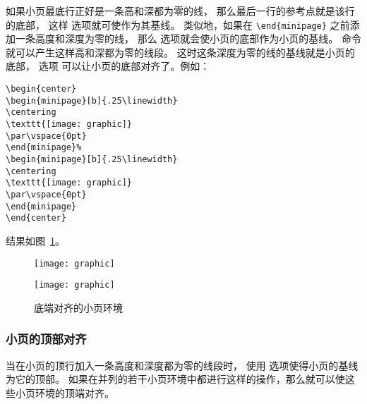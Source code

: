 如果小页最底行正好是一条高和深都为零的线，
那么最后一行的参考点就是该行的底部，
这样 \opt{[b]} 选项就可使作为其基线。
类似地，如果在 \verb|\end{minipage}| 之前添加一条高度和深度为零的线，
那么 \opt{[b]} 选项就会使小页的底部作为小页的基线。
命令  就可以产生这样高和深都为零的线段。
这时这条深度为零的线的基线就是小页的底部，
选项 \opt{[b]} 可以让小页的底部对齐了。例如：
\begin{lstlisting}
\begin{center}
\begin{minipage}[b]{.25\linewidth}
\centering
\texttt{[image: graphic]}
\par\vspace{0pt}
\end{minipage}%
\begin{minipage}[b]{.25\linewidth}
\centering
\texttt{[image: graphic]}
\par\vspace{0pt}
\end{minipage}
\end{center}
\end{lstlisting}
结果如图~\ref{fig:minipagesamp-2}。
\begin{figure}
\begin{center}
	\begin{minipage}[b]{.25\linewidth}
		\centering
		\texttt{[image: graphic]}
		\par\vspace{0pt}
	\end{minipage}%
	\begin{minipage}[b]{.25\linewidth}
		\centering
		\texttt{[image: graphic]}
		\par\vspace{0pt}
	\end{minipage}
\end{center}
\caption{底端对齐的小页环境}\label{fig:minipagesamp-2}
\end{figure}

\subsubsection{小页的顶部对齐}
当在小页的顶行加入一条高度和深度都为零的线段时，
使用 \opt{[t]} 选项使得小页的基线为它的顶部。
如果在并列的若干小页环境中都进行这样的操作，那么就可以使这些小页环境的顶端对齐。

